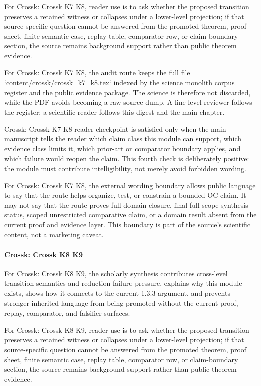 For Crossk: Crossk K7 K8, reader use is to ask whether the proposed transition preserves a retained witness or collapses under a lower-level projection; if that source-specific question cannot be answered from the promoted theorem, proof sheet, finite semantic case, replay table, comparator row, or claim-boundary section, the source remains background support rather than public theorem evidence.


For Crossk: Crossk K7 K8, the audit route keeps the full file `content/crossk/crossk\_k7\_k8.tex` indexed by the science monolith corpus register and the public evidence package. The science is therefore not discarded, while the PDF avoids becoming a raw source dump. A line-level reviewer follows the register; a scientific reader follows this digest and the main chapter.


Crossk: Crossk K7 K8 reader checkpoint is satisfied only when the main manuscript tells the reader which claim class this module can support, which evidence class limits it, which prior-art or comparator boundary applies, and which failure would reopen the claim. This fourth check is deliberately positive: the module must contribute intelligibility, not merely avoid forbidden wording.


For Crossk: Crossk K7 K8, the external wording boundary allows public language to say that the route helps organize, test, or constrain a bounded OC claim. It may not say that the route proves full-domain closure, final full-scope synthesis status, scoped unrestricted comparative claim, or a domain result absent from the current proof and evidence layer. This boundary is part of the source's scientific content, not a marketing caveat.


\paragraph{Crossk: Crossk K8 K9}

For Crossk: Crossk K8 K9, the scholarly synthesis contributes cross-level transition semantics and reduction-failure pressure, explains why this module exists, shows how it connects to the current 1.3.3 argument, and prevents stronger inherited language from being promoted without the current proof, replay, comparator, and falsifier surfaces.


For Crossk: Crossk K8 K9, reader use is to ask whether the proposed transition preserves a retained witness or collapses under a lower-level projection; if that source-specific question cannot be answered from the promoted theorem, proof sheet, finite semantic case, replay table, comparator row, or claim-boundary section, the source remains background support rather than public theorem evidence.


